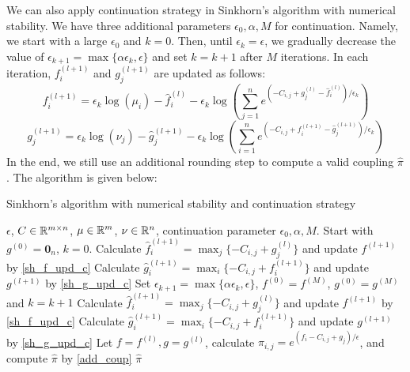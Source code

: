 We can also apply continuation strategy in Sinkhorn's algorithm with numerical stability. We have three additional parameters $\epsilon_0, \alpha, M$ for continuation. Namely, we start with a large $\epsilon_0$ and $k=0$. Then, until $\epsilon_k=\epsilon$, we gradually decrease the value of $\epsilon_{k+1}=\max\{\alpha\epsilon_k,\epsilon \}$ and set $k=k+1$ after $M$ iterations. In each iteration, $f_i^{(l+1)}$ and $g_j^{(l+1)}$ are updated as follows:
\begin{equation}
\label{sh_f_upd_c}
f^{(l+1)}_i = \epsilon_k \log(\mu_i)-\hat f^{(l)}_i-\epsilon_k \log(\sum_{j=1}^ne^{ (-C_{i,j}+g^{(l)}_j-\hat f^{(l)}_i)/\epsilon_k})
\end{equation}
\begin{equation}
\label{sh_g_upd_c}
g^{(l+1)}_j = \epsilon_k \log(\nu_j)-\hat g^{(l+1)}_j-\epsilon_k \log(\sum_{i=1}^ne^{ (-C_{i,j}+f^{(l+1)}_i-\hat g^{(l+1)}_j)/\epsilon_k})
\end{equation}
In the end, we still use an additional rounding step to compute a valid coupling $\hat\pi$. The algorithm is given below:

\begin{algorithm}
\caption{Sinkhorn's algorithm with numerical stability and continuation strategy}
\label{alg:sansc}
\begin{algorithmic}[1]
\REQUIRE $\epsilon$, $C\in\mathbb{R}^{m\times n}$, $\mu\in\mathbb{R}^m$, $\nu\in\mathbb{R}^n$, continuation parameter $\epsilon_0, \alpha, M$.
\STATE Start with $g^{(0)}=\mathbf{0}_n$, $k=0$.
	\STATE Calculate $\hat f^{(l+1)}_i=\max_j\{-C_{i,j}+g^{(l)}_j\}$ and update $f^{(l+1)}$ by \ref{sh_f_upd_c}
	\STATE Calculate $\hat g^{(l+1)}_i=\max_i\{-C_{i,j}+f^{(l+1)}_i\}$ and update $g^{(l+1)}$ by \ref{sh_g_upd_c}
	\ENDFOR
	\STATE Set $\epsilon_{k+1}=\max\{\alpha\epsilon_k,\epsilon \}$, $f^{(0)}=f^{(M)}$, $g^{(0)}=g^{(M)}$ and $k=k+1$
\ENDWHILE
{}
	\STATE Calculate $\hat f^{(l+1)}_i=\max_j\{-C_{i,j}+g^{(l)}_j\}$ and update $f^{(l+1)}$ by \ref{sh_f_upd_c}
	\STATE Calculate $\hat g^{(l+1)}_i=\max_i\{-C_{i,j}+f^{(l+1)}_i\}$ and update $g^{(l+1)}$ by \ref{sh_g_upd_c}
\ENDFOR
\STATE Let $f=f^{(l)}, g=g^{(l)}$, calculate $\pi_{i,j}=e^{(f_i-C_{i,j}+g_j)/\epsilon}$, and compute $\hat\pi$ by \ref{add_coup}
\RETURN $\hat \pi$
\end{algorithmic}
\end{algorithm}

